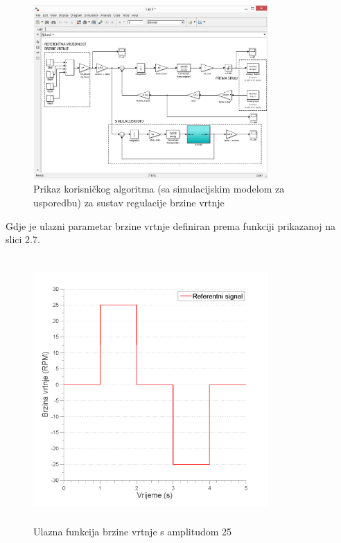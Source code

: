 \documentclass[12pt,a4paper]{article}
\begin{document}
\newpage

\begin{figure}[ht]
	\begin{center}
	\includegraphics[width=0.8\textwidth]{simulator_oznake.png}
    \caption{Prikaz korisničkog algoritma (sa simulacijskim modelom za usporedbu) za sustav regulacije brzine vrtnje}
    \end{center}
\end{figure}

Gdje je ulazni parametar brzine vrtnje definiran prema funkciji prikazanoj na slici 2.7.


\begin{figure}[!h]
	\begin{center}
	\includegraphics[width=0.8\textwidth, height = 4in]{ulazna_f.png}
    \caption{Ulazna funkcija brzine vrtnje s amplitudom 25}
    \end{center}
\end{figure}
\end{document}
